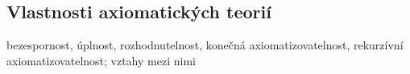 

\subsection{Vlastnosti axiomatických teorií}
bezespornost, úplnost, rozhodnutelnost, konečná axiomatizovatelnost, rekurzívní axiomatizovatelnost; vztahy mezi nimi

